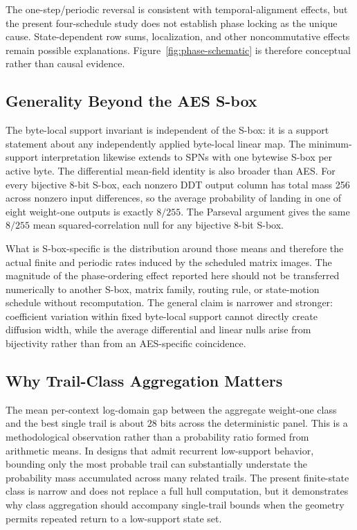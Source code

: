 \documentclass[cryptography,article,submit,oneauthor]{Definitions/mdpi}
\begin{document}
The one-step/periodic reversal is consistent with temporal-alignment effects, but the present four-schedule study does not establish phase locking as the unique cause. State-dependent row sums, localization, and other noncommutative effects remain possible explanations. Figure~\ref{fig:phase-schematic} is therefore conceptual rather than causal evidence.

\subsection{Generality Beyond the AES S-box}\label{sec:6-generality}
The byte-local support invariant is independent of the S-box: it is a support statement about any independently applied byte-local linear map. The minimum-support interpretation likewise extends to SPNs with one bytewise S-box per active byte. The differential mean-field identity is also broader than AES. For every bijective 8-bit S-box, each nonzero DDT output column has total mass 256 across nonzero input differences, so the average probability of landing in one of eight weight-one outputs is exactly $8/255$. The Parseval argument gives the same $8/255$ mean squared-correlation null for any bijective 8-bit S-box.

What is S-box-specific is the distribution around those means and therefore the actual finite and periodic rates induced by the scheduled matrix images. The magnitude of the phase-ordering effect reported here should not be transferred numerically to another S-box, matrix family, routing rule, or state-motion schedule without recomputation. The general claim is narrower and stronger: coefficient variation within fixed byte-local support cannot directly create diffusion width, while the average differential and linear nulls arise from bijectivity rather than from an AES-specific coincidence.

\subsection{Why Trail-Class Aggregation Matters}\label{sec:6-trailclass}
The mean per-context log-domain gap between the aggregate weight-one class and the best single trail is about $28$ bits across the deterministic panel. This is a methodological observation rather than a probability ratio formed from arithmetic means. In designs that admit recurrent low-support behavior, bounding only the most probable trail can substantially understate the probability mass accumulated across many related trails. The present finite-state class is narrow and does not replace a full hull computation, but it demonstrates why class aggregation should accompany single-trail bounds when the geometry permits repeated return to a low-support state set.
\end{document}
